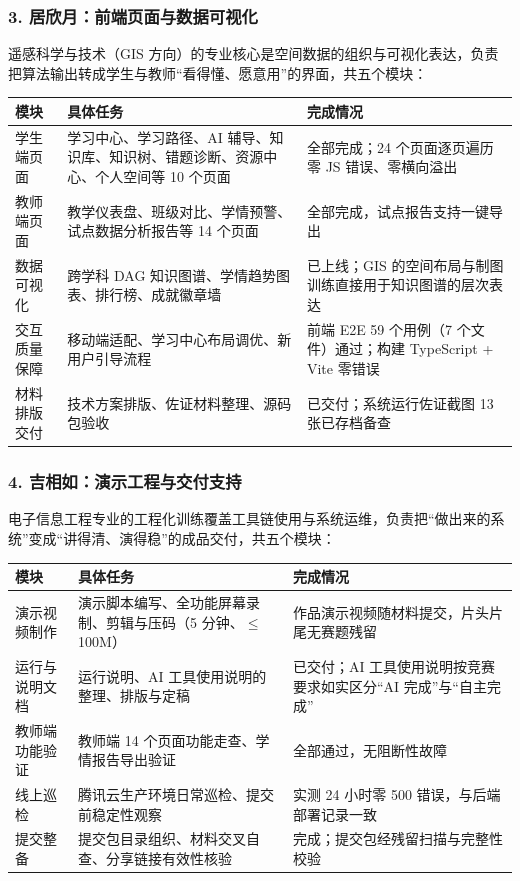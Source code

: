 \documentclass[zihao=-4,a4paper,UTF8,fontset=windows]{ctexart}
\begin{document}
\subsubsection{3. 居欣月：前端页面与数据可视化}


遥感科学与技术（GIS 方向）的专业核心是空间数据的组织与可视化表达，负责把算法输出转成学生与教师“看得懂、愿意用”的界面，共五个模块：

\par\noindent\begin{tabular}{|p{3.0cm}|p{4.5cm}|p{6.2cm}|}
\hline
\textbf{模块} & \textbf{具体任务} & \textbf{完成情况} \\ \hline
学生端页面 & 学习中心、学习路径、AI 辅导、知识库、知识树、错题诊断、资源中心、个人空间等 10 个页面 & 全部完成；24 个页面逐页遍历零 JS 错误、零横向溢出 \\ \hline
教师端页面 & 教学仪表盘、班级对比、学情预警、试点数据分析报告等 14 个页面 & 全部完成，试点报告支持一键导出 \\ \hline
数据可视化 & 跨学科 DAG 知识图谱、学情趋势图表、排行榜、成就徽章墙 & 已上线；GIS 的空间布局与制图训练直接用于知识图谱的层次表达 \\ \hline
交互质量保障 & 移动端适配、学习中心布局调优、新用户引导流程 & 前端 E2E 59 个用例（7 个文件）通过；构建 TypeScript + Vite 零错误 \\ \hline
材料排版交付 & 技术方案排版、佐证材料整理、源码包验收 & 已交付；系统运行佐证截图 13 张已存档备查 \\ \hline
\end{tabular}\par
\subsubsection{4. 吉相如：演示工程与交付支持}


电子信息工程专业的工程化训练覆盖工具链使用与系统运维，负责把“做出来的系统”变成“讲得清、演得稳”的成品交付，共五个模块：

\par\noindent\begin{tabular}{|p{3.0cm}|p{4.5cm}|p{6.2cm}|}
\hline
\textbf{模块} & \textbf{具体任务} & \textbf{完成情况} \\ \hline
演示视频制作 & 演示脚本编写、全功能屏幕录制、剪辑与压码（5 分钟、$\le$100M） & 作品演示视频随材料提交，片头片尾无赛题残留 \\ \hline
运行与说明文档 & 运行说明、AI 工具使用说明的整理、排版与定稿 & 已交付；AI 工具使用说明按竞赛要求如实区分“AI 完成”与“自主完成” \\ \hline
教师端功能验证 & 教师端 14 个页面功能走查、学情报告导出验证 & 全部通过，无阻断性故障 \\ \hline
线上巡检 & 腾讯云生产环境日常巡检、提交前稳定性观察 & 实测 24 小时零 500 错误，与后端部署记录一致 \\ \hline
提交整备 & 提交包目录组织、材料交叉自查、分享链接有效性核验 & 完成；提交包经残留扫描与完整性校验 \\ \hline
\end{tabular}\par
\end{document}
